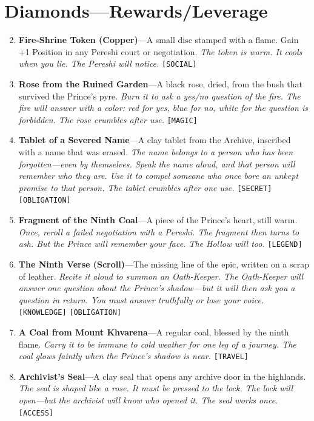 \section*{Diamonds---Rewards/Leverage}
\label{sec:pereshi-rewards}
\begin{enumerate}
\setcounter{enumi}{1}
\item \textbf{Fire-Shrine Token (Copper)}---A small disc stamped with a flame. Gain +1 Position in any Pereshi court or negotiation.
  \hfill \textit{The token is warm. It cools when you lie. The Pereshi will notice.} \texttt{[SOCIAL]}
\item \textbf{Rose from the Ruined Garden}---A black rose, dried, from the bush that survived the Prince's pyre.
  \hfill \textit{Burn it to ask a yes/no question of the fire. The fire will answer with a color: red for yes, blue for no, white for the question is forbidden. The rose crumbles after use.} \texttt{[MAGIC]}
\item \textbf{Tablet of a Severed Name}---A clay tablet from the Archive, inscribed with a name that was erased.
  \hfill \textit{The name belongs to a person who has been forgotten---even by themselves. Speak the name aloud, and that person will remember who they are. Use it to compel someone who once bore an unkept promise to that person. The tablet crumbles after one use.} \texttt{[SECRET]} \texttt{[OBLIGATION]}
\item \textbf{Fragment of the Ninth Coal}---A piece of the Prince's heart, still warm.
  \hfill \textit{Once, reroll a failed negotiation with a Pereshi. The fragment then turns to ash. But the Prince will remember your face. The Hollow will too.} \texttt{[LEGEND]}
\item \textbf{The Ninth Verse (Scroll)}---The missing line of the epic, written on a scrap of leather.
  \hfill \textit{Recite it aloud to summon an Oath-Keeper. The Oath-Keeper will answer one question about the Prince's shadow---but it will then ask you a question in return. You must answer truthfully or lose your voice.} \texttt{[KNOWLEDGE]} \texttt{[OBLIGATION]}
\item \textbf{A Coal from Mount Khvarena}---A regular coal, blessed by the ninth flame.
  \hfill \textit{Carry it to be immune to cold weather for one leg of a journey. The coal glows faintly when the Prince's shadow is near.} \texttt{[TRAVEL]}
\item \textbf{Archivist's Seal}---A clay seal that opens any archive door in the highlands.
  \hfill \textit{The seal is shaped like a rose. It must be pressed to the lock. The lock will open---but the archivist will know who opened it. The seal works once.} \texttt{[ACCESS]}

\end{enumerate}
